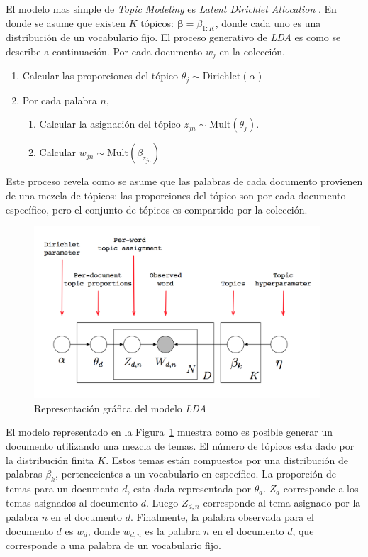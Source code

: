 \documentclass[12pt,oneside,letterpaper]{book}
\newcommand{\eng}[1]{\textit{#1}\xspace}			%
\theoremstyle{definition}
\begin{document}
El modelo mas simple de \eng{Topic Modeling} es \eng{Latent Dirichlet Allocation} \cite{BleiLDA2003}. En donde se asume que existen $K$ tópicos: $\boldsymbol\beta = \beta_{1:K}$, donde cada uno es una distribución de un vocabulario fijo. El proceso generativo de \emph{LDA} es como se describe a continuación. Por cada documento $w_j$ en la colección,

\begin{enumerate}
	\item Calcular las proporciones del tópico $\theta_j \sim \text{Dirichlet}(\alpha)$
	\item Por cada palabra $n$,
	\begin{enumerate}
		\item Calcular la asignación del tópico $z_{jn} \sim \text{Mult}(\theta_j)$.
		\item Calcular $w_{jn} \sim \text{Mult}(\beta_{z_{jn}})$
	\end{enumerate}
\end{enumerate}

Este proceso revela como se asume que las palabras de cada documento provienen de una mezcla de tópicos: las proporciones del tópico son por cada documento específico, pero el conjunto de tópicos es compartido por la colección.

\begin{figure}[h!]
	\centering
	\includegraphics[width=0.95\textwidth]{images/lda.png}
	\caption{Representación gráfica del modelo \eng{LDA}}
	\label{fig:lda}
\end{figure}   

El modelo representado en la Figura~\ref{fig:lda} muestra como es posible generar un documento utilizando una mezcla de temas. El número de tópicos esta dado por la distribución finita $K$. Estos temas están compuestos por una distribución de palabras $\beta_k$, pertenecientes a un vocabulario en específico. La proporción de temas para un documento $d$, esta dada representada por $\theta_d$. $Z_d$ corresponde a los temas asignados al documento $d$. Luego $Z_{d,n}$ corresponde al tema asignado por la palabra $n$ en el documento $d$. Finalmente, la palabra observada para el documento $d$ es $w_d$, donde $w_{d,n}$ es la palabra $n$ en el documento $d$, que corresponde a una palabra de un vocabulario fijo.
\end{document}
